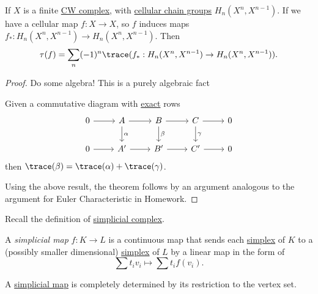 \begin{theorem}\label{thm-}
	If \(X\) is a finite \hyperref[def:CW-Complex]{CW complex}, with \hyperref[def:cellular-chain-complex]{cellular chain groups} \(H_n(X^n, X^{n - 1})\).
	If we have a cellular map \(f \colon X \to X\), so \(f\) induces maps \(f_\ast \colon H_n(X^n, X^{n - 1}) \to H_n(X^n, X^{n - 1})\). Then
	\[
		\tau(f) = \sum_n (-1)^n \trace(f_\ast : H_n(X^n, X^{n - 1}) \to H_n(X^n, X^{n - 1})).
	\]
\end{theorem}
\begin{proof}
	Do some algebra! This is a purely algebraic fact
	\begin{exercise}
		Given a commutative diagram with \hyperref[def:exact]{exact} rows
		\[
			\begin{tikzcd}
				0 & A & B & C & 0 \\
				0 & {A^\prime} & {B^\prime} & {C^\prime} & 0
				\arrow["\gamma", from=1-4, to=2-4]
				\arrow["\beta", from=1-3, to=2-3]
				\arrow["\alpha", from=1-2, to=2-2]
				\arrow[from=2-1, to=2-2]
				\arrow[from=2-2, to=2-3]
				\arrow[from=2-4, to=2-5]
				\arrow[from=2-3, to=2-4]
				\arrow[from=1-4, to=1-5]
				\arrow[from=1-3, to=1-4]
				\arrow[from=1-2, to=1-3]
				\arrow[from=1-1, to=1-2]
			\end{tikzcd}
		\]
		then \(\trace(\beta) = \trace(\alpha) + \trace(\gamma)\).
	\end{exercise}

	Using the above result, the theorem follows by an argument analogous to the argument for Euler Characteristic in Homework.
\end{proof}
\begin{prev}
	Recall the definition of \hyperref[def:simplicial-complex]{simplicial complex}.
\end{prev}

\begin{definition}\label{def:simplicial-map}
	A \emph{simplicial map} \(f \colon K \to L\) is a continuous map that sends each \hyperref[def:standard-simplex]{simplex} of \(K\) to a (possibly smaller dimensional)
	\hyperref[def:standard-simplex]{simplex} of \(L\) by a linear map in the form of
	\[
		\sum t_iv_i \mapsto \sum t_if(v_i).
	\]
\end{definition}
\begin{remark}
	A \hyperref[def:simplicial-map]{simplicial map} is completely determined by its restriction to the vertex set.
\end{remark}
